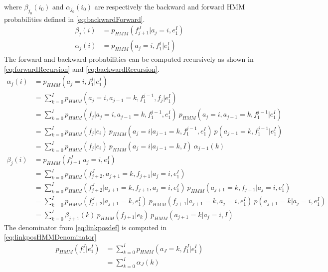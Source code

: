 %
where $\beta_{j_0}(i_0)$ and $\alpha_{j_0}(i_0)$ are respectively
the backward and forward HMM probabilities defined in \autoref{eq:backwardForward}.
%
\begin{equation}
  \begin{split}
    \beta_{j}(i)  &= p_{HMM}(f_{j + 1}^J | a_{j} = i, e_1^I) \\
    \alpha_{j}(i) &= p_{HMM}(a_{j} = i, f_1^{j} | e_1^I)
  \end{split}
  \label{eq:backwardForward}
\end{equation}
%
The forward and backward probabilities can be computed recursively as
shown in \autoref{eq:forwardRecursion} and \autoref{eq:backwardRecursion}.
%
\begin{align}
  \alpha_{j}(i) &= p_{HMM}(a_{j} = i, f_1^{j} | e_1^I) \nonumber \\
                &= \sum_{k = 0}^I p_{HMM}(a_{j} = i, a_{j - 1} = k, f_1^{j - 1}, f_j | e_1^I) \nonumber \\
                &= \sum_{k = 0}^I p_{HMM}(f_j | a_j = i, a_{j - 1} = k, f_1^{j-1}, e_1^I) \ p_{HMM}(a_{j} = i, a_{j - 1} = k, f_1^{j - 1} | e_1^I) \nonumber \\
                &= \sum_{k = 0}^I p_{HMM}(f_j | e_i) \ p_{HMM}(a_{j} = i | a_{j - 1} = k, f_1^{j - 1}, e_1^I) \ p(a_{j - 1} = k, f_1^{j - 1} | e_1^I) \nonumber \\
                &= \sum_{k = 0}^I p_{HMM}(f_j | e_i) \ p_{HMM}(a_{j} = i | a_{j - 1} = k, I) \ \alpha_{j - 1}(k) \label{eq:forwardRecursion} \\
  \beta_{j}(i)  &= p_{HMM}(f_{j + 1}^J | a_{j} = i, e_1^I) \nonumber \\
                &= \sum_{k = 0}^I p_{HMM}(f_{j+2}^J, a_{j + 1} = k, f_{j + 1} | a_j = i, e_1^I) \nonumber \\
                &= \sum_{k = 0}^I p_{HMM}(f_{j+2}^J | a_{j + 1} = k, f_{j + 1}, a_j = i, e_1^I) \ p_{HMM}(a_{j + 1} = k, f_{j + 1} | a_j = i, e_1^I) \nonumber \\
                &= \sum_{k = 0}^I p_{HMM}(f_{j+2}^J | a_{j + 1} = k, e_1^I) \ p_{HMM}(f_{j + 1} | a_{j + 1} = k, a_j = i, e_1^I) \ p(a_{j + 1} = k | a_j = i, e_1^I) \nonumber \\
                &= \sum_{k = 0}^I \beta_{j + 1}(k) \ p_{HMM}(f_{j + 1} | e_k) \ p_{HMM}(a_{j + 1} = k | a_j = i, I) \label{eq:backwardRecursion}
\end{align}
%
The denominator from \autoref{eq:linkposdef} is computed in
\autoref{eq:linkposHMMDenominator}
%
\begin{align}
  p_{HMM}(f_1^J | e_1^I) &= \sum_{k = 0}^I p_{HMM}(a_J = k, f_1^J | e_1^I) \nonumber \\
                         &= \sum_{k = 0}^I \alpha_J(k) \label{eq:linkposHMMDenominator}
\end{align}
